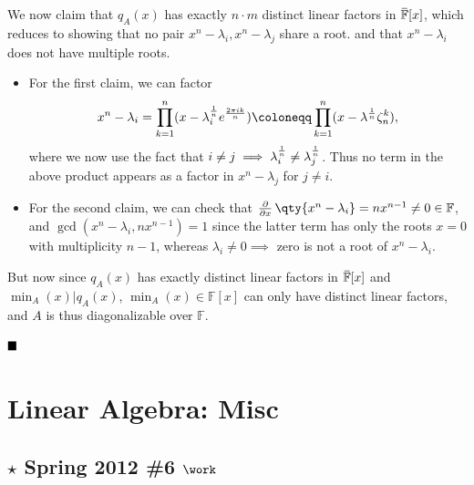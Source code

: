\begin{solution}
We now claim that \(q_A(x)\) has exactly \(n\cdot m\) distinct linear
factors in
\(\mkern 1.5mu\overline{\mkern-1.5mu{\mathbb{F}}\mkern-1.5mu}\mkern 1.5mu[x]\),
which reduces to showing that no pair \(x^n-\lambda_i, x^n-\lambda_j\)
share a root. and that \(x^n-\lambda_i\) does not have multiple roots.

\begin{itemize}
\item
  For the first claim, we can factor
  \begin{align*}
  x^n - \lambda_i = \prod_{k=1}^n (x - \lambda_i^{1\over n} e^{2\pi i k \over n}) \coloneqq\prod_{k=1}^n (x-\lambda^{1\over n} \zeta_n^k)
  ,\end{align*}
  where we now use the fact that
  \(i\neq j \implies \lambda_i^{1\over n} \neq \lambda_j^{1\over n}\).
  Thus no term in the above product appears as a factor in
  \(x^n - \lambda_j\) for \(j\neq i\).
\item
  For the second claim, we can check that
  \({\frac{\partial }{\partial x}\,}\qty{x^n - \lambda_i} = nx^{n-1}\neq 0\in {\mathbb{F}}\),
  and \(\gcd(x^n-\lambda_i, nx^{n-1}) = 1\) since the latter term has
  only the roots \(x=0\) with multiplicity \(n-1\), whereas
  \(\lambda_i\neq 0 \implies\) zero is not a root of \(x^n-\lambda_i\).
\end{itemize}

But now since \(q_A(x)\) has exactly distinct linear factors in
\(\mkern 1.5mu\overline{\mkern-1.5mu{\mathbb{F}}\mkern-1.5mu}\mkern 1.5mu[x]\)
and \(\min_A(x) \mathrel{\Big|}q_A(x)\),
\(\min_A(x) \in {\mathbb{F}}[x]\) can only have distinct linear factors,
and \(A\) is thus diagonalizable over \({\mathbb{F}}\).

\(\hfill\blacksquare\)

\end{solution}

\hypertarget{linear-algebra-misc}{%
\section{Linear Algebra: Misc}\label{linear-algebra-misc}}

\hypertarget{star-spring-2012-6-work}{%
\subsection{\texorpdfstring{\(\star\) Spring 2012 \#6
\(\work\)}{\textbackslash star Spring 2012 \#6 \textbackslash work}}\label{star-spring-2012-6-work}}

